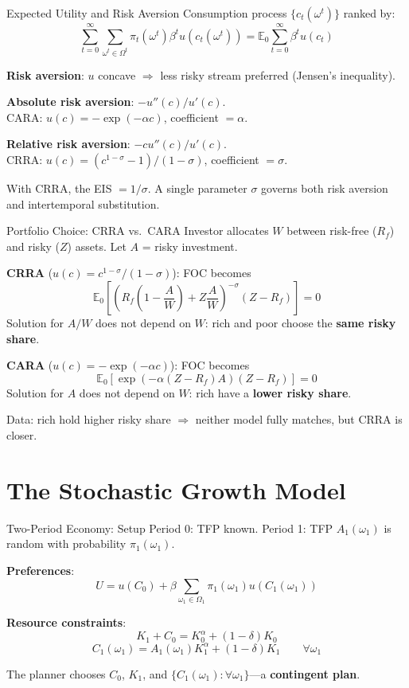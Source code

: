 \documentclass[blue]{beamer}
\newcommand{\E}{\mathbb{E}}
\begin{document}
\begin{frame}{Expected Utility and Risk Aversion}
	Consumption process $\{c_t(\omega^t)\}$ ranked by:
	\[
	\sum_{t=0}^{\infty} \sum_{\omega^t \in \Omega^t} \pi_t(\omega^t) \beta^t u(c_t(\omega^t)) = \E_0 \sum_{t=0}^{\infty} \beta^t u(c_t)
	\]
	
	\textbf{Risk aversion}: $u$ concave $\Rightarrow$ less risky stream preferred (Jensen's inequality).
	
	\bigskip
	\textbf{Absolute risk aversion}: $-u''(c)/u'(c)$.\\ CARA: $u(c) = -\exp(-\alpha c)$, coefficient $= \alpha$.
	
	\bigskip
	\textbf{Relative risk aversion}: $-cu''(c)/u'(c)$.\\ CRRA: $u(c) = (c^{1-\sigma}-1)/(1-\sigma)$, coefficient $= \sigma$.
	
	\bigskip
	With CRRA, the EIS $= 1/\sigma$. A single parameter $\sigma$ governs both risk aversion and intertemporal substitution.
\end{frame}

\begin{frame}{Portfolio Choice: CRRA vs.\ CARA}
	Investor allocates $W$ between risk-free ($R_f$) and risky ($Z$) assets. Let $A$ = risky investment.
	

	\textbf{CRRA} ($u(c) = c^{1-\sigma}/(1-\sigma)$): FOC becomes
	\[
	\E_0\left[\left(R_f\left(1 - \frac{A}{W}\right) + Z\frac{A}{W}\right)^{-\sigma}(Z - R_f)\right] = 0
	\]
	Solution for $A/W$ does not depend on $W$: rich and poor choose the \textbf{same risky share}.
	
	\textbf{CARA} ($u(c) = -\exp(-\alpha c)$): FOC becomes
	\[
	\E_0\left[\exp\left(-\alpha(Z - R_f)A\right)(Z - R_f)\right] = 0
	\]
	Solution for $A$ does not depend on $W$: rich have a \textbf{lower risky share}.
	
	Data: rich hold higher risky share $\Rightarrow$ neither model fully matches, but CRRA is closer.
\end{frame}

\section{The Stochastic Growth Model}

\begin{frame}{Two-Period Economy: Setup}
	Period 0: TFP known. Period 1: TFP $A_1(\omega_1)$ is random with probability $\pi_1(\omega_1)$.
	
	\bigskip
	\textbf{Preferences}: 
	$$
	U = u(C_0) + \beta \sum_{\omega_1 \in \Omega_1} \pi_1(\omega_1) u(C_1(\omega_1))
	$$
	
	\bigskip
	\textbf{Resource constraints}:
	\[
	K_1 + C_0 = K_0^\alpha + (1-\delta)K_0
	\]
	\[
	C_1(\omega_1) = A_1(\omega_1) K_1^\alpha + (1-\delta)K_1 \qquad \forall \omega_1
	\]
	
	The planner chooses $C_0$, $K_1$, and $\{C_1(\omega_1) : \forall \omega_1\}$---a \textbf{contingent plan}.
\end{frame}
\end{document}
